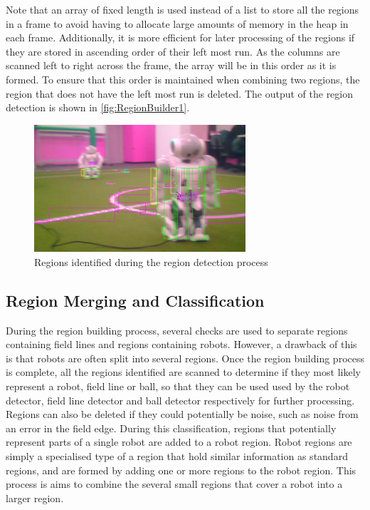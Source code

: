 \documentclass[pdftex,11pt,a4paper]{report}
\begin{document}
Note that an array of fixed length is used instead of a list to store all the regions in a frame to avoid having to allocate large amounts of memory in the heap in each frame. Additionally, it is more efficient for later processing of the regions if they are stored in ascending order of their left most run. As the columns are scanned left to right across the frame, the array will be in this order as it is formed. To ensure that this order is maintained when combining two regions, the region that does not have the left most run is deleted. The output of the region detection is shown in \autoref{fig:RegionBuilder1}.

\begin{figure} [t]
\centering
\includegraphics[width=0.7\textwidth]{figures/regionScreenshot1.png}
\caption{Regions identified during the region detection process} \label{fig:RegionBuilder1}
\end{figure}

\subsection{Region Merging and Classification}

During the region building process, several checks are used to separate regions containing field lines and regions containing robots. However, a drawback of this is that robots are often split into several regions. Once the region building process is complete, all the regions identified are scanned to determine if they most likely represent a robot, field line or ball, so that they can be used used by the robot detector, field line detector and ball detector respectively for further processing. Regions can also be deleted if they could potentially be noise, such as noise from an error in the field edge. During this classification, regions that potentially represent parts of a single robot are added to a robot region. Robot regions are simply a specialised type of a region that hold similar information as standard regions, and are formed by adding one or more regions to the robot region. This process is aims to combine the several small regions that cover a robot into a larger region. 
\end{document}
